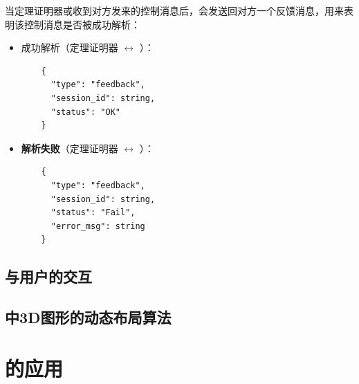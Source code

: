 当定理证明器或收到对方发来的控制消息后，会发送回对方一个反馈消息，用来表明该控制消息是否被成功解析：
\begin{itemize}
	\item \textsf{成功解析}（定理证明器 $\longleftrightarrow$ ）：
	\begin{verbatim}
	{
	  "type": "feedback",
	  "session_id": string,
	  "status": "OK"
	}
	\end{verbatim}
	\item \textbf{解析失败}（定理证明器 $\longleftrightarrow$ ）：
	\begin{verbatim}
	{
	  "type": "feedback",
	  "session_id": string,
	  "status": "Fail",
	  "error_msg": string
	}
	\end{verbatim}
\end{itemize}
\subsection{与用户的交互}


\subsection{中3D图形的动态布局算法}

\section{的应用}



